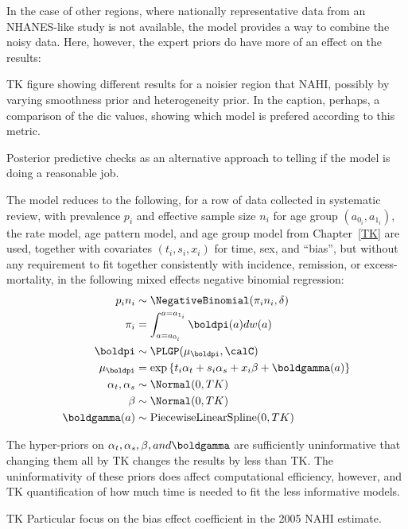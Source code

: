 In the case of other regions, where nationally representative data
from an NHANES-like study is not available, the model provides a way
to combine the noisy data.  Here, however, the expert priors do have
more of an effect on the results:

TK figure showing different results for a noisier region that NAHI,
possibly by varying smoothness prior and heterogeneity prior.  In the
caption, perhaps, a comparison of the dic values, showing which model
is prefered according to this metric.

Posterior predictive checks as an alternative approach to telling if
the model is doing a reasonable job.

The model reduces to the following, for a row of data collected in
systematic review, with prevalence $p_i$ and effective sample size $n_i$ for
age group $(a_{0_i}, a_{1_i})$, the rate model, age pattern model,
and age group model from Chapter~\ref{TK} are used, together with
covariates $(t_i,s_i,x_i)$ for time, sex, and ``bias'', but without any requirement to
fit together consistently with incidence, remission, or
excess-mortality, in the following mixed effects negative binomial
regression:
\begin{align*}
p_i n_i &\sim \NegativeBinomial(\pi_i n_i, \delta)\\
\pi_i &= \int _{a=a_{0_i}} ^{a=a_{1_i}} \boldpi(a) dw(a)\\
\boldpi &\sim \PLGP(\mu_\boldpi, \calC)\\
\mu_\boldpi &= \exp\left\{ t_i \alpha_t + s_i \alpha_s + x_i \beta + \boldgamma(a) \right\}\\
\alpha_t, \alpha_s &\sim \Normal(0, TK)\\
\beta &\sim \Normal(0, TK)\\
\boldgamma(a) &\sim \text{PiecewiseLinearSpline}(0, TK)
\end{align*}

The hyper-priors on $\alpha_t, \alpha_s, \beta, and \boldgamma$ are
sufficiently uninformative that changing them all by TK changes the
results by less than TK.  The uninformativity of these priors does
affect computational efficiency, however, and TK quantification of how
much time is needed to fit the less informative models.

TK Particular focus on the bias effect coefficient in the 2005 NAHI estimate.
